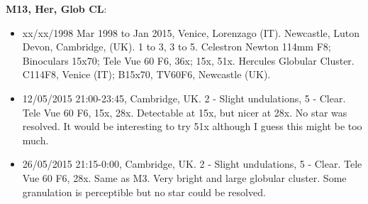 {\bf M13, Her, Glob CL}:
\begin{itemize}
\item xx/xx/1998 Mar 1998 to Jan 2015, Venice, Lorenzago (IT). Newcastle, Luton Devon, Cambridge, (UK). 1 to 3, 3 to 5. Celestron Newton 114mm F8; Binoculars 15x70; Tele Vue 60 F6, 36x; 15x, 51x. Hercules Globular Cluster. C114F8, Venice (IT); B15x70, TV60F6, Newcastle (UK).
\item 12/05/2015 21:00-23:45, Cambridge, UK. 2 - Slight undulations, 5 - Clear. Tele Vue 60 F6, 15x, 28x. Detectable at 15x, but nicer at 28x. No star was resolved. It would be interesting to try 51x although I guess this might be too much. 
\item 26/05/2015 21:15-0:00, Cambridge, UK. 2 - Slight undulations, 5 - Clear. Tele Vue 60 F6, 28x. Same as M3. Very bright and large globular cluster. Some granulation is perceptible but no star could be resolved.
\end{itemize}

